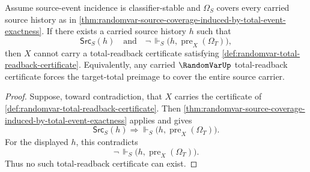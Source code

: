 \begin{proposition}
\label{prop:randomvar-partiality-obstruction-target-total-preimage}
Assume source-event incidence is classifier-stable and $\Omega_S$ covers every carried source history as in \autoref{thm:randomvar-source-coverage-induced-by-total-event-exactness}. If there exists a carried source history $h$ such that
$$
\mathsf{Src}_S(h)
\quad\text{and}\quad
\neg\,\Vdash_S\bigl(h,\operatorname{pre}_X(\Omega_T)\bigr),
$$
then $X$ cannot carry a total-readback certificate satisfying \autoref{def:randomvar-total-readback-certificate}.
Equivalently, any carried $\RandomVarUp$ total-readback certificate forces the target-total preimage to cover the entire source carrier.
\end{proposition}
\begin{proof}
Suppose, toward contradiction, that $X$ carries the certificate of \autoref{def:randomvar-total-readback-certificate}. Then \autoref{thm:randomvar-source-coverage-induced-by-total-event-exactness} applies and gives
$$
\mathsf{Src}_S(h)
\Longrightarrow
\Vdash_S\bigl(h,\operatorname{pre}_X(\Omega_T)\bigr).
$$
For the displayed $h$, this contradicts
$$
\neg\,\Vdash_S\bigl(h,\operatorname{pre}_X(\Omega_T)\bigr).
$$
Thus no such total-readback certificate can exist.
\end{proof}

